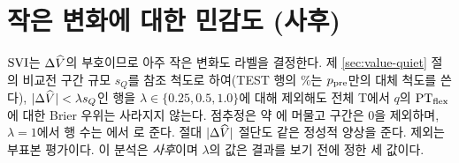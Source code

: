 \section{작은 변화에 대한 민감도 (사후)}
\label{sec:val-lambda}

$\mathrm{SVI}$는 $\Delta\widehat V$의 부호이므로 아주 작은 변화도 라벨을 결정한다. 제 \ref{sec:value-quiet} 절의 비교전 구간 규모 $s_Q$를 참조 척도로 하여(TEST 행의 \sharePonlyFallback\%는 $p_{\mathrm{pre}}$만의 대체 척도를 쓴다), $|\Delta\widehat V| < \lambda s_Q$인 행을 $\lambda \in \{0.25, 0.5, 1.0\}$에 대해 제외해도 전체 T에서 $q$의 $\mathrm{PT}_{\mathrm{flex}}$에 대한 Brier 우위는 사라지지 않는다. 점추정은 약 \lambdaDeltaApprox{}에 머물고 구간은 0을 제외하며, $\lambda = 1$에서 행 수는 \numTTest{}에서 \numRowsLambdaOne{}로 준다. 절대 $|\Delta\widehat V|$ 절단도 같은 정성적 양상을 준다. 제외는 부표본 평가이다. 이 분석은 \emph{사후}이며 $\lambda$의 값은 결과를 보기 전에 정한 세 값이다.
